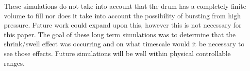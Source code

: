         These simulations do not take into account that the drum has a completely finite volume to fill nor does it take into account the possibility of bursting from high pressure. Future work could expand upon this, however this is not necessary for this paper. The goal of these long term simulations was to determine that the shrink/swell effect was occurring and on what timescale would it be necessary to see those effects. Future simulations will be well within physical controllable ranges. 
